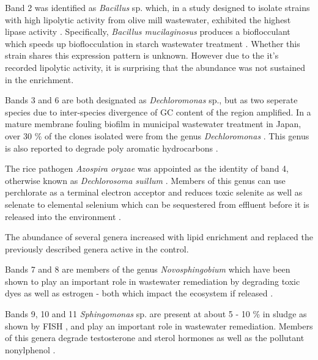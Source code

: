 \documentclass[11pt]{article}
\begin{document}
Band 2 was identified as \emph{Bacillus} sp. which, in a study designed to isolate strains with high lipolytic activity from olive mill wastewater, exhibited the highest lipase activity \cite{ertuugrul2007isolation}. Specifically, \emph{Bacillus mucilaginosus} produces a bioflocculant which speeds up bioflocculation in starch wastewater treatment \cite{deng2003characteristics}. Whether this strain shares this expression pattern is unknown. However due to the it's recorded lipolytic activity, it is surprising that the abundance was not sustained in the enrichment.

Bands 3 and 6 are both designated as \emph{Dechloromonas} sp., but as two seperate species due to inter-species divergence of GC content of the region amplified. In a mature membrane fouling biofilm in municipal wastewater treatment in Japan, over 30 \% of the clones isolated were from the genus \emph{Dechloromonas} \cite{miura2007membrane}. This genus is also reported to degrade poly aromatic hydrocarbons \cite{oshiki2008pha}.

The rice pathogen \emph{Azospira oryzae} was appointed as the identity of band 4, otherwise known as \emph{Dechlorosoma suillum} \cite{tan2003dechlorosoma}. Members of this genus can use perchlorate as a terminal electron acceptor and reduces toxic selenite as well as selenate to elemental selenium which can be sequestered from effluent before it is released into the environment \cite{reinhold2000reassessment,hunter2007azospira,wilhelmus2013microbiological}.

\vspace{.5cm}
The abundance of several genera increased with lipid enrichment and replaced the previously described genera active in the control.

Bands 7 and 8 are members of the genus \emph{Novosphingobium} which have been shown to play an important role in wastewater remediation by degrading toxic dyes as well as estrogen - both which impact the ecosystem if released \cite{addison2007novosphingobium,hashimoto2009contribution}.


Bands 9, 10 and 11 \emph{Sphingomonas} sp. are present at about 5 - 10 \% in sludge as shown by FISH \cite{neef1999detection}, and play an important role in wastewater remediation. Members of this genera degrade testosterone and sterol hormones as well as the pollutant nonylphenol \cite{fujii2001sphingomonas,roh201017beta}.
\end{document}
